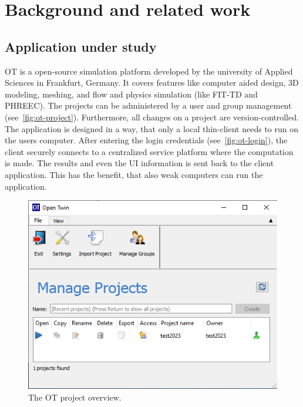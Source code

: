 
\chapter{Background and related work} %

\label{chap:background} %


\section{Application under study}
\ac{OT} is a open-source simulation platform developed by the university of Applied Sciences in Frankfurt, Germany. It covers features like computer aided design, 3D modeling, meshing, and flow and physics simulation (like FIT-TD and PHREEC). The projects can be administered by a user and group management (see~\autoref{fig:ot-project}). Furthermore, all changes on a project are version-controlled. The application is designed in a way, that only a local thin-client needs to run on the users computer. After entering the login credentials (see~\autoref{fig:ot-login}), the client securely connects to a centralized service platform where the computation is made. The results and even the \ac{UI} information is sent back to the client application. This has the benefit, that also weak computers can run the application. 

\begin{figure}[h]
	\centering
	\includegraphics[width=.9\textwidth]{Figures/ot-project.png}
	\caption{The \ac{OT} project overview.}
	\label{fig:ot-project}
\end{figure}

